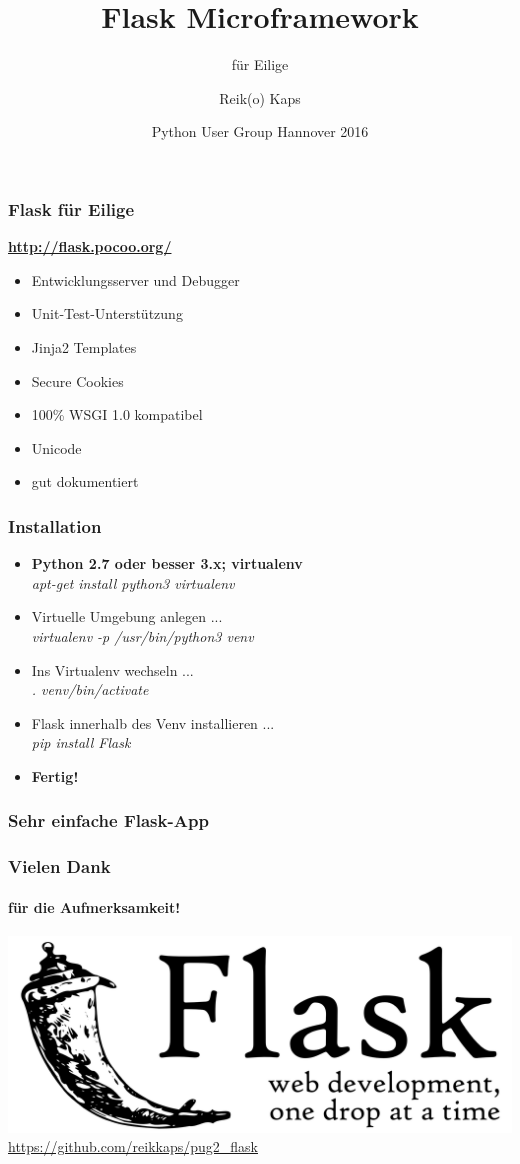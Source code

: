 \documentclass{beamer}
\title[Flask] %
{Flask Microframework}
\subtitle{für Eilige}
\author[Kaps] %
{Reik(o) Kaps}
\date[2016] %
{Python User Group Hannover 2016}
\begin{document}
\frame{\titlepage}
  \begin{frame}
    \frametitle{Flask für Eilige}
    \textbf{\url{http://flask.pocoo.org/}}
    \begin{itemize}
    \item Entwicklungsserver und Debugger
    \item Unit-Test-Unterstützung
    \item Jinja2 Templates
    \item Secure Cookies
    \item 100\% WSGI 1.0 kompatibel
    \item Unicode
    \item gut dokumentiert
    \end{itemize}
  \end{frame}

  \begin{frame}
    \frametitle{Installation}
    \begin{itemize}
    \item 
      \textbf{Python 2.7 oder besser 3.x; virtualenv} \\
      \emph{apt-get install python3 virtualenv}
    \item
      Virtuelle Umgebung anlegen ... \\
      \emph{virtualenv -p /usr/bin/python3 venv}
    \item
      Ins Virtualenv wechseln ... \\
      \emph{. venv/bin/activate}
    \item
      Flask innerhalb des Venv installieren ... \\
      \emph{pip install Flask}

    \item \textbf{Fertig!}
    \end{itemize}

  \end{frame}

  \begin{frame}
    \frametitle{Sehr einfache Flask-App}

    
  \end{frame}

  \begin{frame}
    \frametitle{Vielen Dank}
    \framesubtitle{für die Aufmerksamkeit!}
    \includegraphics[scale=0.5]{flask_logo.png} \\
    \url{https://github.com/reikkaps/pug2_flask}
  \end{frame}
    
\end{document}
